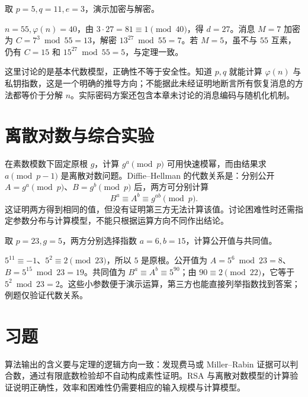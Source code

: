\documentclass[UTF8,12pt,a4paper,fontset=fandol]{ctexbook}
\begin{document}
\begin{example}
取 $p=5,q=11,e=3$，演示加密与解密。
\end{example}
\begin{solve}
$n=55,\varphi(n)=40$，由 $3\cdot27=81\equiv1\pmod{40}$，得 $d=27$。消息 $M=7$ 加密为 $C=7^3\bmod55=13$，解密 $13^{27}\bmod55=7$。若 $M=5$，虽不与 $55$ 互素，仍有 $C=15$ 和 $15^{27}\bmod55=5$，与定理一致。
\end{solve}

这里讨论的是基本代数模型，正确性不等于安全性。知道 $p,q$ 就能计算 $\varphi(n)$ 与私钥指数，这是一个明确的推导方向；不能据此未经证明地断言所有恢复消息的方法都等价于分解 $n$。实际密码方案还包含本章未讨论的消息编码与随机化机制。

\section{离散对数与综合实验}

在素数模数下固定原根 $g$，计算 $g^a\pmod p$ 可用快速模幂，而由结果求 $a\pmod{p-1}$ 是离散对数问题。Diffie--Hellman 的代数关系是：分别公开 $A=g^a\pmod p$、$B=g^b\pmod p$ 后，两方可分别计算
\[
 B^a\equiv A^b\equiv g^{ab}\pmod p.
\]
这证明两方得到相同的值，但没有证明第三方无法计算该值。讨论困难性时还需指定参数分布与计算模型，不能只根据运算方向不同作出结论。

\begin{example}[核对离散对数模型中的共同值]
取 $p=23,g=5$，两方分别选择指数 $a=6,b=15$，计算公开值与共同值。
\end{example}
\begin{solve}
$5^{11}\equiv-1$、$5^2\equiv2\pmod{23}$，所以 $5$ 是原根。公开值为 $A=5^6\bmod23=8$、$B=5^{15}\bmod23=19$。共同值为 $B^a\equiv A^b\equiv5^{90}$；由 $90\equiv2\pmod{22}$，它等于 $5^2\bmod23=2$。这些小参数便于演示运算，第三方也能直接列举指数找到答案；例题仅验证代数关系。
\end{solve}

\section{习题}

算法输出的含义要与定理的逻辑方向一致：发现费马或 Miller--Rabin 证据可以判合数，通过有限底数检验却不自动构成素性证明。RSA 与离散对数模型的计算验证说明正确性，效率和困难性仍需要相应的输入规模与计算模型。
\end{document}
